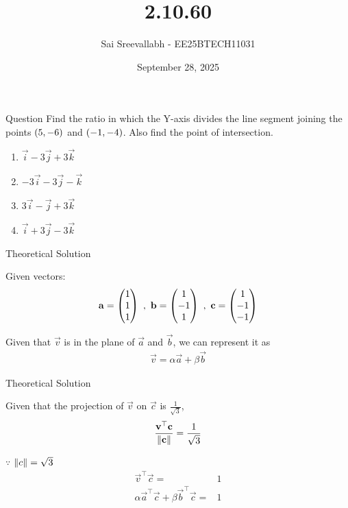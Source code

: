 \documentclass{beamer}
\title{2.10.60}
\author{Sai Sreevallabh - EE25BTECH11031}
\date{September 28, 2025}
\begin{document}
\frame{\titlepage}

\begin{frame}{Question}
Find the ratio in which the Y-axis divides the line segment joining the points $\left(5,-6\right)$ and $\left(-1,-4\right)$. Also find the point of intersection.\\

\begin{enumerate}
    \item $\vec{i}-3\vec{j}+3\vec{k}$
    \item $-3\vec{i}-3\vec{j}-\vec{k}$
    \item $3\vec{i}-\vec{j}+3\vec{k}$
    \item $\vec{i}+3\vec{j}-3\vec{k}$
\end{enumerate}

\end{frame}


\begin{frame}{Theoretical Solution}

Given vectors: 
\begin{align}
    \vec{a} = \myvec{1\\1\\1} \ , \ \vec{b} = \myvec{1\\-1\\1} \ , \ \vec{c} = \myvec{1\\-1\\-1}
\end{align}

Given that $\vec{v}$ is in the plane of $\vec{a}$ and $\vec{b}$, we can represent it as
\begin{align}
    \vec{v} = \alpha\vec{a} + \beta\vec{b}
\end{align}

\end{frame}

\begin{frame}{Theoretical Solution}

Given that the projection of $\vec{v}$ on $\vec{c}$ is $\frac{1}{\sqrt{3}}$, 
\begin{align}
    \frac{\mathbf{v}^\top\mathbf{c}}{\left\lVert\mathbf{c}\right\rVert} = \frac{1}{\sqrt{3}}
\end{align}

$\because$ $\left\lVert c\right\rVert = \sqrt{3}$
\begin{align}
    \vec{v}^\top\vec{c} =& 1\\
    \alpha\vec{a}^\top\vec{c} + \beta\vec{b}^\top\vec{c} =& 1
\end{align}

\end{frame}
\end{document}
